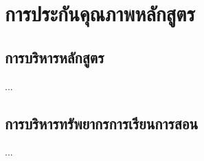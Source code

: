 \chapter{การประกันคุณภาพหลักสูตร}

\section{การบริหารหลักสูตร}
...

\section{การบริหารทรัพยากรการเรียนการสอน}
...
